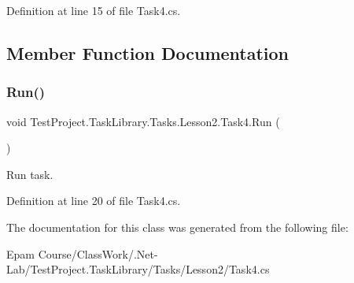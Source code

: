 Definition at line 15 of file Task4.\+cs.



\subsection{Member Function Documentation}
\mbox{\label{class_test_project_1_1_task_library_1_1_tasks_1_1_lesson2_1_1_task4_a6690ba8e985b4db429e194964ddf20be}} 
\subsubsection{\texorpdfstring{Run()}{Run()}}
{\footnotesize\ttfamily void Test\+Project.\+Task\+Library.\+Tasks.\+Lesson2.\+Task4.\+Run (\begin{DoxyParamCaption}{ }\end{DoxyParamCaption})}



Run task. 



Definition at line 20 of file Task4.\+cs.



The documentation for this class was generated from the following file\+:\begin{DoxyCompactItemize}
\item 
Epam Course/\+Class\+Work/.\+Net-\/\+Lab/\+Test\+Project.\+Task\+Library/\+Tasks/\+Lesson2/Task4.\+cs\end{DoxyCompactItemize}
